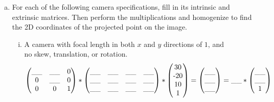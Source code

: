 \begin{enumerate} [(a)]
\item For each of the following camera specifications, fill in its intrinsic and extrinsic matrices. Then perform the multiplications and homogenize to find the 2D coordinates of the projected point on the image.
\begin{enumerate} [(i)]

\item A camera with focal length in both $x$ and $y$ directions of $1$, and\\
no skew, translation, or rotation.
\vspace{-0.3cm}
\begin{align}
    \begin{pmatrix} 
    \_\_ & \_\_ & $0$ \\ 
    $0$ & \_\_ & $0$ \\ 
    $0$ & $0$ & $1$ \end{pmatrix} *
    \begin{pmatrix} 
    \_\_ & \_\_ & \_\_ & \_\_ \\ 
    \_\_ & \_\_ & \_\_ & \_\_ \\ 
    \_\_ & \_\_ & \_\_ & \_\_ \end{pmatrix} * 
    \begin{pmatrix} 
    $30$ \\ 
    $-20$ \\ 
    $10$ \\ 
    $1$ \end{pmatrix}
    = \begin{pmatrix}  \_\_ \\ \_\_ \\ \_\_ \end{pmatrix}
    = \_\_ * \begin{pmatrix}  \_\_ \\ \_\_ \\ $1$ \end{pmatrix}
\end{align}


\end{enumerate}
\end{enumerate}
